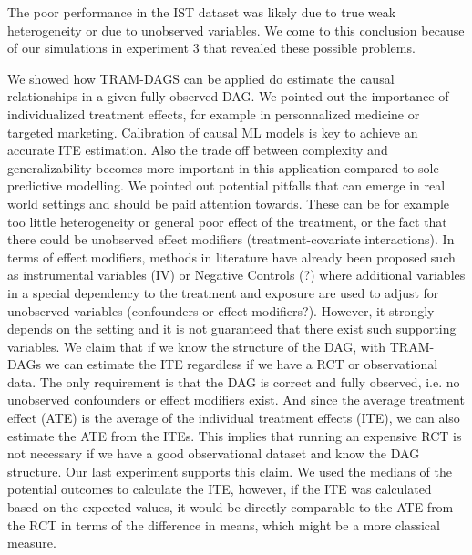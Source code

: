 The poor performance in the IST dataset was likely due to true weak heterogeneity or due to unobserved variables. We come to this conclusion because of our simulations in experiment 3 that revealed these possible problems.


We showed how TRAM-DAGS can be applied do estimate the causal relationships in a given fully observed DAG. We pointed out the importance of individualized treatment effects, for example in personnalized medicine or targeted marketing. Calibration of causal ML models is key to achieve an accurate ITE estimation. Also the trade off between complexity and generalizability becomes more important in this application compared to sole predictive modelling. We pointed out potential pitfalls that can emerge in real world settings and should be paid attention towards. These can be for example too little heterogeneity or general poor effect of the treatment, or the fact that there could be unobserved effect modifiers (treatment-covariate interactions). In terms of effect modifiers, methods in literature have already been proposed such as instrumental variables (IV) or Negative Controls (?) where additional variables in a special dependency to the treatment and exposure are used to adjust for unobserved variables (confounders or effect modifiers?). However, it strongly depends on the setting and it is not guaranteed that there exist such supporting variables. We claim that if we know the structure of the DAG, with TRAM-DAGs we can estimate the ITE regardless if we have a RCT or observational data. The only requirement is that the DAG is correct and fully observed, i.e. no unobserved confounders or effect modifiers exist. And since the average treatment effect (ATE) is the average of the individual treatment effects (ITE), we can also estimate the ATE from the ITEs. This implies that running an expensive RCT is not necessary if we have a good observational dataset and know the DAG structure. Our last experiment supports this claim. We used the medians of the potential outcomes to calculate the ITE, however, if the ITE was calculated based on the expected values, it would be directly comparable to the ATE from the RCT in terms of the difference in means, which might be a more classical measure. 
